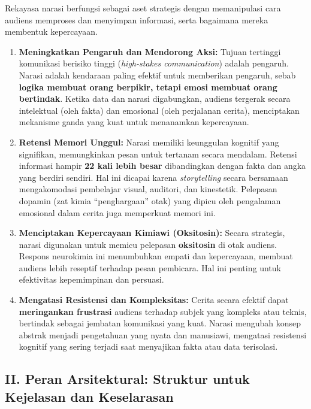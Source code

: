 \documentclass[
  letterpaper,
  DIV=11,
  numbers=noendperiod]{scrreprt}
\providecommand{\tightlist}{%
  \setlength{\itemsep}{0pt}\setlength{\parskip}{0pt}}
\begin{document}
Rekayasa narasi berfungsi sebagai aset strategis dengan memanipulasi
cara audiens memproses dan menyimpan informasi, serta bagaimana mereka
membentuk kepercayaan.

\begin{enumerate}
\def\labelenumi{\arabic{enumi}.}
\tightlist
\item
  \textbf{Meningkatkan Pengaruh dan Mendorong Aksi:} Tujuan tertinggi
  komunikasi berisiko tinggi (\emph{high-stakes communication}) adalah
  pengaruh. Narasi adalah kendaraan paling efektif untuk memberikan
  pengaruh, sebab \textbf{logika membuat orang berpikir, tetapi emosi
  membuat orang bertindak}. Ketika data dan narasi digabungkan, audiens
  tergerak secara intelektual (oleh fakta) dan emosional (oleh
  perjalanan cerita), menciptakan mekanisme ganda yang kuat untuk
  menanamkan kepercayaan.
\item
  \textbf{Retensi Memori Unggul:} Narasi memiliki keunggulan kognitif
  yang signifikan, memungkinkan pesan untuk tertanam secara mendalam.
  Retensi informasi hampir \textbf{22 kali lebih besar} dibandingkan
  dengan fakta dan angka yang berdiri sendiri. Hal ini dicapai karena
  \emph{storytelling} secara bersamaan mengakomodasi pembelajar visual,
  auditori, dan kinestetik. Pelepasan dopamin (zat kimia ``penghargaan''
  otak) yang dipicu oleh pengalaman emosional dalam cerita juga
  memperkuat memori ini.
\item
  \textbf{Menciptakan Kepercayaan Kimiawi (Oksitosin):} Secara
  strategis, narasi digunakan untuk memicu pelepasan \textbf{oksitosin}
  di otak audiens. Respons neurokimia ini menumbuhkan empati dan
  kepercayaan, membuat audiens lebih reseptif terhadap pesan pembicara.
  Hal ini penting untuk efektivitas kepemimpinan dan persuasi.
\item
  \textbf{Mengatasi Resistensi dan Kompleksitas:} Cerita secara efektif
  dapat \textbf{meringankan frustrasi} audiens terhadap subjek yang
  kompleks atau teknis, bertindak sebagai jembatan komunikasi yang kuat.
  Narasi mengubah konsep abstrak menjadi pengetahuan yang nyata dan
  manusiawi, mengatasi resistensi kognitif yang sering terjadi saat
  menyajikan fakta atau data terisolasi.
\end{enumerate}

\subsection{II. Peran Arsitektural: Struktur untuk Kejelasan dan
Keselarasan}\label{ii.-peran-arsitektural-struktur-untuk-kejelasan-dan-keselarasan}
\end{document}
